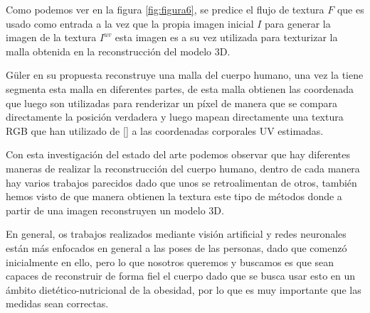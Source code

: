 Como podemos ver en la figura \ref{fig:figura6}, se predice el flujo de textura $F$ que es usado como  entrada a la vez que la propia imagen inicial $I$ para generar la imagen de la textura $I^{uv}$ esta imagen es a su vez utilizada para texturizar la malla obtenida en la reconstrucción del modelo 3D.


Güler en su propuesta reconstruye una malla del cuerpo humano, una vez la tiene segmenta esta malla en diferentes partes, de esta malla obtienen las coordenada que luego son utilizadas para renderizar un píxel de manera que se compara directamente la posición verdadera y luego mapean directamente una textura RGB que han utilizado de [\cite{Varol_2017}] a las coordenadas corporales UV estimadas.


Con esta investigación del estado del arte podemos observar que hay diferentes maneras de realizar la reconstrucción del cuerpo humano, dentro de cada manera hay varios trabajos parecidos dado que unos se retroalimentan de otros, también hemos visto de que manera obtienen la textura este tipo de métodos donde a partir de una imagen reconstruyen un modelo 3D. 

En general, os trabajos realizados mediante visión artificial y redes neuronales están más enfocados en general a las poses de las personas, dado que comenzó inicialmente en ello, pero lo que nosotros queremos y buscamos es que sean capaces de reconstruir de forma fiel el cuerpo dado que se busca usar esto en un ámbito dietético-nutricional de la obesidad, por lo que es muy importante que las medidas sean correctas.







\label{sec:Introducción}

